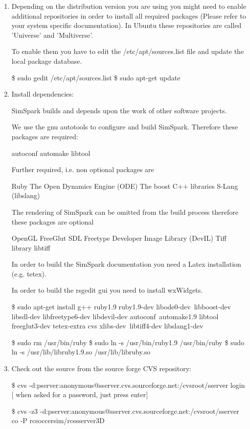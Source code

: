 \begin{enumerate}

\item Depending on the distribution version you are using you might need
to enable additional repositories in order to install all required
packages (Please refer to your system specific documentation). In
Ubuntu these repositories are called 'Universe' and 'Multiverse'.

To enable them you have to edit the /etc/apt/sources.list file and
update the local package database.

\$ sudo gedit /etc/apt/sources.list
\$ sudo apt-get update

\item Install dependencies:

SimSpark builds and depends upon the work of other software
projects.

We use the gnu autotools to configure and build SimSpark. Therefore
these packages are required:

autoconf
automake
libtool

Further required, i.e. non optional packages are

Ruby
The Open Dynamics Engine (ODE)
The boost C++ libraries
S-Lang (libslang)

The rendering of SimSpark can be omitted from the build process
therefore these packages are optional

OpenGL
FreeGlut
SDL
Freetype
Developer Image Library (DevIL)
Tiff library libtiff

In order to build the SimSpark documentation you need a Latex
installation (e.g. tetex).

In order to build the rsgedit gui you need to install wxWidgets.

\$ sudo apt-get install g++ ruby1.9 ruby1.9-dev libode0-dev\
libboost-dev libsdl-dev libfreetype6-dev libdevil-dev autoconf\
automake1.9 libtool freeglut3-dev tetex-extra cvs xlibs-dev\
libtiff4-dev libslang1-dev

\$ sudo rm /usr/bin/ruby
\$ sudo ln -s /usr/bin/ruby1.9 /usr/bin/ruby
\$ sudo ln -s /usr/lib/libruby1.9.so /usr/lib/libruby.so

\item Check out the source from the source forge CVS repository:

\$ cvs -d:pserver:anonymous@sserver.cvs.sourceforge.net:/cvsroot/sserver login
[ when asked for a password, just press enter]

\$ cvs -z3 -d:pserver:anonymous@sserver.cvs.sourceforge.net:/cvsroot/sserver co -P rcsoccersim/rcssserver3D


\end{enumerate}
